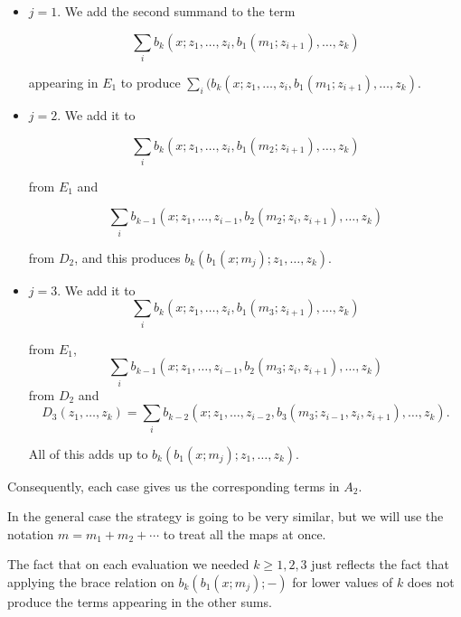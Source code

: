 \documentclass[twoside]{article}
\begin{document}
\begin{itemize}
\item $j=1$. We add the second summand to the term 

\[\sum_ib_k(x;z_1,\dots, z_i,b_1(m_1;z_{i+1}),\dots, z_{k})\]

appearing in $E_1$ to produce $\sum_i(b_k(x;z_1,\dots, z_i,b_1(m_1;z_{i+1}),\dots, z_{k})$.

\item $j=2$. We add it to 

$$\sum_ib_k(x;z_1,\dots, z_i,b_1(m_2;z_{i+1}),\dots, z_{k})$$

from $E_1$ and 

$$\sum_ib_{k-1}(x;z_1,\dots, z_{i-1}, b_2(m_2;z_i,z_{i+1}),\dots,z_{k})$$

from $D_2$, and this produces $b_k(b_1(x;m_j);z_1,\dots, z_k)$.

\item $j=3$. We add it to 
$$\sum_ib_k(x;z_1,\dots, z_i,b_1(m_3;z_{i+1}),\dots, z_{k})$$

from $E_1$, 
$$\sum_ib_{k-1}(x;z_1,\dots, z_{i-1}, b_2(m_3;z_i,z_{i+1}),\dots,z_{k})$$
from $D_2$ and
$$D_3(z_1,\dots, z_{k})=\sum_ib_{k-2}(x;z_1,\dots, z_{i-2}, b_3(m_3;z_{i-1},z_i,z_{i+1}),\dots,z_{k}).$$

All of this adds up to $b_k(b_1(x;m_j);z_1,\dots, z_k)$.

\end{itemize} 

Consequently, each case gives us the corresponding terms in $A_2$.



In the general case the strategy is going to be very similar, but we will use the notation $m=m_1+m_2+\cdots$ to treat all the maps at once. 

\begin{remark}
The fact that on each evaluation we needed $k\geq 1,2,3$ just reflects the fact that applying the brace relation on $b_k(b_1(x;m_j);-)$ for lower values of $k$ does not produce the terms appearing in the other sums. 
\end{remark}


\end{document}
